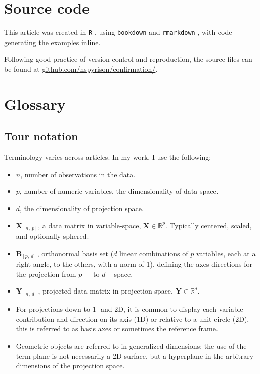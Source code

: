 \documentclass{monashthesis}
\begin{document}
\chapter{Source code}\label{sec:source}

This article was created in \texttt{R} \autocite{r_core_team_r:_2018},
using \texttt{bookdown} \autocite{xie_bookdown:_2016} and
\texttt{rmarkdown} \autocite{xie_r_2018}, with code generating the
examples inline.

Following good practice of version control and reproduction, the source
files can be found at
\href{https://github.com/nspyrison/Confirmation}{github.com/nspyrison/confirmation/}.

\appendix

\chapter{Glossary}\label{ch:glossary}

\section{Tour notation}\label{sec:tour_notation}

Terminology varies across articles. In my work, I use the following:

\begin{itemize}
\tightlist
\item
  \(n\), number of observations in the data.
\item
  \(p\), number of numeric variables, the dimensionality of data space.
\item
  \(d\), the dimensionality of projection space.
\item
  \(\textbf{X}_{[n,~p]}\), a data matrix in variable-space,
  \(\textbf{X} \in \mathbb{R}^{p}\). Typically centered, scaled, and
  optionally sphered.
\item
  \(\textbf{B}_{[p,~d]}\), orthonormal basis set (\(d\) linear
  combinations of \(p\) variables, each at a right angle, to the others,
  with a norm of 1), defining the axes directions for the projection
  from \(p-\) to \(d-\)space.
\item
  \(\textbf{Y}_{[n,~d]}\), projected data matrix in projection-space,
  \(\textbf{Y} \in \mathbb{R}^{d}\).
\item
  For projections down to 1- and 2D, it is common to display each
  variable contribution and direction on its axis (1D) or relative to a
  unit circle (2D), this is referred to as basis axes or sometimes the
  reference frame.
\item
  Geometric objects are referred to in generalized dimensions; the use
  of the term plane is not necessarily a 2D surface, but a hyperplane in
  the arbitrary dimensions of the projection space.
\end{itemize}
\end{document}
